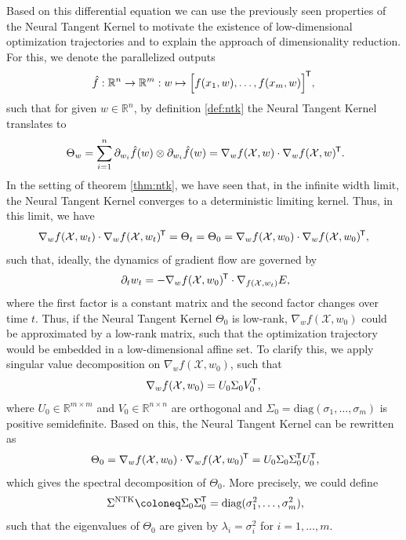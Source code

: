 \documentclass[11pt, a4paper]{article}
\newcommand{\R}{\mathbb{R}}
\newcommand{\X}{\mathcal{X}}
\newcommand*{\tr}{^{\mkern-1.5mu\mathsf{T}}}
\begin{document}
Based on this differential equation we can use the previously seen properties of the Neural Tangent Kernel to motivate the existence of low-dimensional optimization trajectories and to explain the approach of dimensionality reduction. For this, we denote the parallelized outputs
\[ \hat{f}: \R^{n} \to \R^m : w \mapsto \Big [ f(x_1,w), \dots, f(x_m,w) \Big ]\tr , \]
such that for given $w \in \R^n$, by definition \ref{def:ntk} the Neural Tangent Kernel translates to
\[ \Theta_{w} = \sum_{i=1}^{n} \partial_{w_i} \hat{f}(w) \otimes \partial_{w_i} \hat{f}(w) = \nabla_wf(\X,w) \cdot \nabla_wf(\X,w)\tr. \]
In the setting of theorem \ref{thm:ntk}, we have seen that, in the infinite width limit, the Neural Tangent Kernel converges to a deterministic limiting kernel. Thus, in this limit, we have
\[ \nabla_wf(\X,w_t) \cdot \nabla_wf(\X,w_t)\tr = \Theta_t = \Theta_0 = \nabla_wf(\X,w_0) \cdot \nabla_wf(\X,w_0)\tr, \] 
such that, ideally, the dynamics of gradient flow are governed by
\[ \partial_tw_t = - \nabla_w f(\X, w_0)\tr \cdot \nabla_{f(\X,w_t)} E, \]
where the first factor is a constant matrix and the second factor changes over time $t$. Thus, if the Neural Tangent Kernel $\Theta_0$ is low-rank, $\nabla_wf(\X,w_0)$ could be approximated by a low-rank matrix, such that the optimization trajectory would be embedded in a low-dimensional affine set. To clarify this, we apply singular value decomposition on $\nabla_wf(\X,w_0)$, such that 
\[ \nabla_wf(\X,w_0) = U_0 \Sigma_0 V_0\tr , \]
where $U_0 \in \R^{m \times m}$ and $V_0 \in \R^{n \times n}$ are orthogonal and $\Sigma_0 = \text{diag}(\sigma_1, \dots, \sigma_m)$ is positive semidefinite. Based on this, the Neural Tangent Kernel can be rewritten as
\[ \Theta_0 = \nabla_wf(\X,w_0) \cdot \nabla_wf(\X,w_0)\tr  = U_0 \Sigma_0 \Sigma_0\tr  U_0\tr, \]
which gives the spectral decomposition of $\Theta_0$. More precisely, we could define
\[ \Sigma^\text{NTK} \coloneq \Sigma_0 \Sigma_0 \tr = \text{diag}(\sigma_1^2, \dots, \sigma_m^2), \]
such that the eigenvalues of $\Theta_0$ are given by $\lambda_i = \sigma_i^2$ for $i=1, \dots, m$.
\end{document}
